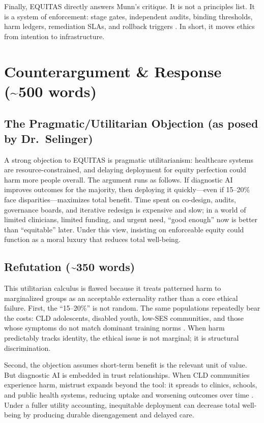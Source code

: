 \vspace{0.5em}
Finally, EQUITAS directly answers Munn’s critique. It is not a principles list. It is a system of enforcement: stage gates, independent audits, binding thresholds, harm ledgers, remediation SLAs, and rollback triggers \citep{Munn2023}. In short, it moves ethics from intention to infrastructure.

\section{Counterargument \& Response (\texorpdfstring{\textasciitilde}{~}500 words)}

\subsection{The Pragmatic/Utilitarian Objection (as posed by Dr.\ Selinger)}
A strong objection to EQUITAS is pragmatic utilitarianism: healthcare systems are resource-constrained, and delaying deployment for equity perfection could harm more people overall. The argument runs as follows. If diagnostic AI improves outcomes for the majority, then deploying it quickly—even if 15--20\% face disparities—maximizes total benefit. Time spent on co-design, audits, governance boards, and iterative redesign is expensive and slow; in a world of limited clinicians, limited funding, and urgent need, ``good enough'' now is better than ``equitable'' later. Under this view, insisting on enforceable equity could function as a moral luxury that reduces total well-being.

\subsection{Refutation (\texorpdfstring{\textasciitilde}{~}350 words)}
This utilitarian calculus is flawed because it treats patterned harm to marginalized groups as an acceptable externality rather than a core ethical failure. First, the ``15--20\%'' is not random. The same populations repeatedly bear the costs: CLD adolescents, disabled youth, low-SES communities, and those whose symptoms do not match dominant training norms \citep{Marko2025}. When harm predictably tracks identity, the ethical issue is not marginal; it is structural discrimination.

\vspace{0.5em}
Second, the objection assumes short-term benefit is the relevant unit of value. But diagnostic AI is embedded in trust relationships. When CLD communities experience harm, mistrust expands beyond the tool: it spreads to clinics, schools, and public health systems, reducing uptake and worsening outcomes over time \citep{Sagona2025}. Under a fuller utility accounting, inequitable deployment can decrease total well-being by producing durable disengagement and delayed care.

